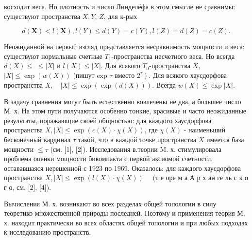 \documentclass[10pt]{article}
\begin{document}
восходит веса. Но плотность и число Линделёфа в этом смысле не сравнимы: существуют пространства $X, Y$, $Z$, для к-рых



\[

d(\boldsymbol{X})<l(\boldsymbol{X}), l(Y) \leqslant d(Y)=c(Y), l(Z)=d(Z)=c(Z) .

\]



Неожиданной на первый взгляд представляется несравнимость мощности и веса: существуют нормальные счетные $T_{1}$-пространства несчетного веса. Но всегда $d(X) \leqslant$ $\leqslant|X|$ и $l(X) \leqslant|X|$. Для всякого $T_{0}$-пространства $X$, $|X| \leqslant \exp (w(X))$ (пишут exp $\tau$ вместо $\left.2^{\tau}\right)$. Для всякого хаусдорфова пространства $X, \quad|X| \leqslant \exp (\exp (d(X)))$. Всегда $w(X) \leqslant \exp |X|$.



В задачу сравнения могут быть естественно вовлечены не два, а большее число М. х. На этом пути получаются особенно тонкие, красивые и часто неожиданные результаты, поражающие своей общностью: для каждого хаусдорфова пространства $X,|X| \leqslant \exp (c(X) \cdot \chi(X))$, где $\chi(X)$ - наименьший бесконечный кардинал $\tau$ такой, что в каждой точке пространства $X$ имеется база мощности $\leqslant \tau$ (см. [1], [2]). Исследования в.теории M. х. стимулировала проблема оценки мощности бикомпакта с первой аксиомой счетности, остававшаяся нерешенной с 1923 по 1969. Оказалось: для каждого хаусдорфова пространства $X,|X| \leqslant \exp (l(X) \cdot \chi(X)) \quad$ (т е оре м а А р х ан ге ль с к о г о, см. [2], [4]).



Вычисления М. х. возникают во всех разделах общей топологии в силу теоретико-множественной природы последней. Поэтому и применения теория М. х. находит практически во всех областях общей топологии и при любых подходах к исследованию пространств.
\end{document}
